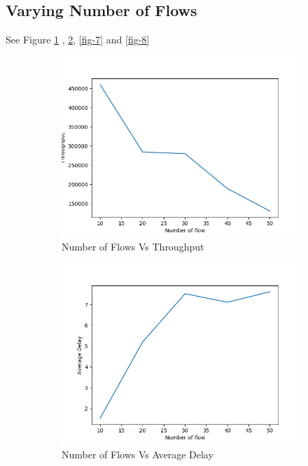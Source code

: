 \documentclass[14pt]{scrartcl} %
\begin{document}
\subsection{Varying Number of Flows}
See Figure \ref{fig-5} , \ref{fig-6}, \ref{fig-7} and \ref{fig-8}
\begin{figure}[h]
    \begin{subfigure}{.5\textwidth}
    \centering
    \includegraphics[width=.8\linewidth]{Graph/flowVsThroughput.png}
    \caption{Number of Flows Vs Throughput}
    \label{fig-5}
\end{subfigure}
\begin{subfigure}{.5\textwidth}
    \centering
    \includegraphics[width=.8\linewidth]{Graph/flowVsAverageDelay.png}
    \caption{Number of Flows Vs Average Delay}
    \label{fig-6}
\end{subfigure}
\begin{subfigure}{.5\textwidth}
    \centering

\end{subfigure}
\end{figure}
\end{document}
